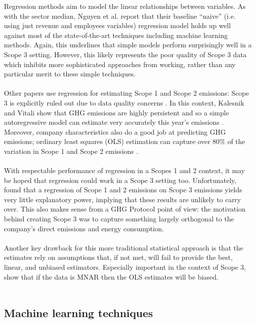 \documentclass[12pt,twoside]{report}
\begin{document}
Regression methods aim to model the linear relationships between variables. As with the sector median, Nguyen et al. \cite{Nguyenetal2023} report that their baseline ``naive'' (i.e. using just revenue and employees variables) regression model holds up well against most of the state-of-the-art techniques including machine learning methods. Again, this underlines that simple models perform surprisingly well in a Scope 3 setting. However, this likely represents the poor quality of Scope 3 data which inhibits more sophisticated approaches from working, rather than any particular merit to these simple techniques.  
\\ \\
Other papers use regression for estimating Scope 1 and Scope 2 emissions: Scope 3 is explicitly ruled out due to data quality concerns \cite{KalesnikVitali2022, GoldhammerEtAl2017}. In this context, Kalesnik and Vitali show that GHG emissions are highly persistent and so a simple autoregressive model can estimate very accurately this year's emissions \cite{KalesnikVitali2022}. Moreover, company characteristics also do a good job at predicting GHG emissions; ordinary least squares (OLS) estimation can capture over 80\% of the variation in Scope 1 and Scope 2 emissions \cite{GoldhammerEtAl2017, KalesnikVitali2022}. 
\\ \\
With respectable performance of regression in a Scopes 1 and 2 context, it may be hoped that regression could work in a Scope 3 setting too. Unfortunately, \cite{ManGroup2022} found that a regression of Scope 1 and 2 emissions on Scope 3 emissions yields very little explanatory power, implying that these results are unlikely to carry over. This also makes sense from a GHG Protocol point of view: the motivation behind creating Scope 3 was to capture something largely orthogonal to the company's direct emissions and energy consumption. 
\\ \\
Another key drawback for this more traditional statistical approach is that the estimates rely on assumptions that, if not met, will fail to provide the best, linear, and unbiased estimators. Especially important in the context of Scope 3, \cite{olesiewicz2021} show that if the data is MNAR then the OLS estimates will be biased.
\\ \\

\subsection{Machine learning techniques}
\end{document}
